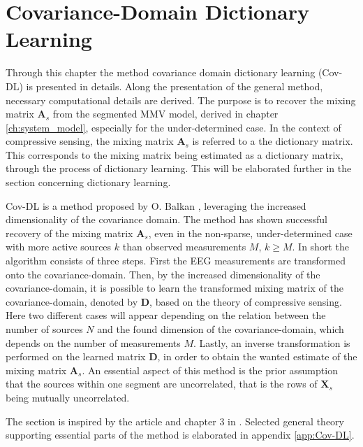 \chapter{Covariance-Domain Dictionary Learning}\label{ch:Cov-DL}
Through this chapter the method covariance domain dictionary learning (Cov-DL) is presented in details. 
Along the presentation of the general method, necessary computational details are derived.
The purpose is to recover the mixing matrix $\mathbf{A}_s$ from the segmented MMV model, derived in chapter \ref{ch:system_model}, especially for the under-determined case. 
In the context of compressive sensing, the mixing matrix $\mathbf{A}_s$ is referred to a the dictionary matrix. 
This corresponds to the mixing matrix being estimated as a dictionary matrix, through the process of dictionary learning. 
This will be elaborated further in the section concerning dictionary learning.

Cov-DL is a method proposed by O. Balkan \cite{Balkan2015}, leveraging the increased dimensionality of the covariance domain. 
The method has shown successful recovery of the mixing matrix $\mathbf{A}_s$, even in the non-sparse, under-determined case with more active sources $k$ than observed measurements $M$, $k \geq M$. 
In short the algorithm consists of three steps. 
First the EEG measurements are transformed onto the covariance-domain. 
Then, by the increased dimensionality of the covariance-domain, it is possible to learn the transformed mixing matrix of the covariance-domain, denoted by $\mathbf{D}$, based on the theory of compressive sensing. 
Here two different cases will appear depending on the relation between the number of sources $N$ and the found dimension of the covariance-domain, which depends on the number of measurements $M$. 
Lastly, an inverse transformation is performed on the learned matrix $\mathbf{D}$, in order to obtain the wanted estimate of the mixing matrix $\mathbf{A}_s$. 
An essential aspect of this method is the prior assumption that the sources within one segment are uncorrelated, that is the rows of $\mathbf{X}_s$ being mutually uncorrelated. 

The section is inspired by the article \cite{Balkan2015} and chapter 3 in \cite{phd2015}. 
Selected general theory supporting essential parts of the method is elaborated in appendix \ref{app:Cov-DL}.


%